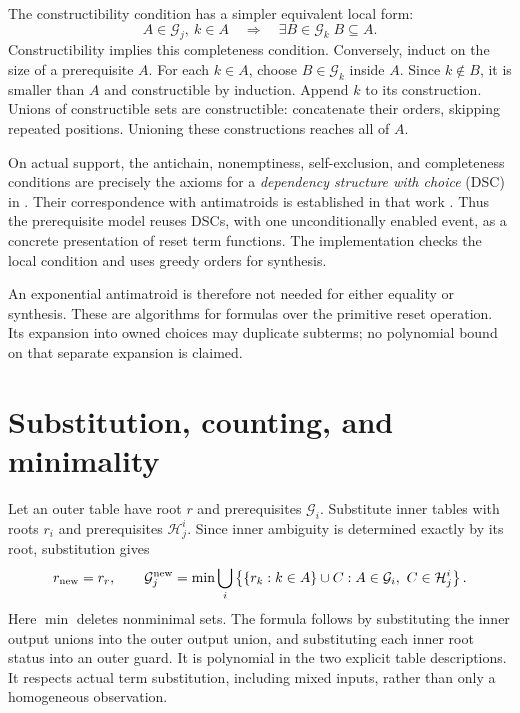 \documentclass[11pt]{article}
\begin{document}
The constructibility condition has a simpler equivalent local form:
\begin{equation}\label{eq:complete}
 A\in\mathcal G_j,\ k\in A
 \quad\Longrightarrow\quad
 \exists B\in\mathcal G_k\; B\subseteq A.
\end{equation}
Constructibility implies this completeness condition. Conversely,
induct on the size of a prerequisite $A$. For each $k\in A$, choose
$B\in\mathcal G_k$ inside $A$. Since $k\notin B$, it is smaller than
$A$ and constructible by induction. Append $k$ to its construction.
Unions of constructible sets are constructible: concatenate their
orders, skipping repeated positions. Unioning these constructions
reaches all of $A$.

On actual support, the antichain, nonemptiness, self-exclusion, and
completeness conditions are precisely the axioms for a \emph{dependency
structure with choice} (DSC) in
\cite[Definition~2.9]{BazermanMinichielloPuzio2023}. Their correspondence
with antimatroids is established in that work
\cite[Theorem~3.15]{BazermanMinichielloPuzio2023}. Thus the prerequisite
model reuses DSCs, with one unconditionally enabled event, as a concrete
presentation of reset term functions. The implementation checks the
local condition and uses greedy orders for synthesis.

An exponential antimatroid is therefore not needed for either
equality or synthesis. These are algorithms for formulas over the
primitive reset operation. Its expansion into owned choices may
duplicate subterms; no polynomial bound on that separate expansion
is claimed.

\section{Substitution, counting, and minimality}

Let an outer table have root $r$ and prerequisites $\mathcal G_i$.
Substitute inner tables with roots $r_i$ and prerequisites
$\mathcal H^i_j$. Since inner ambiguity is determined exactly by its
root, substitution gives
\begin{equation}\label{eq:substitution}
 r_{\rm new}=r_r,\qquad
 \mathcal G^{\rm new}_j=
 \min\bigcup_i
 \left\{\{r_k:k\in A\}\cup C:
       A\in\mathcal G_i,\ C\in\mathcal H^i_j\right\}.
\end{equation}
Here $\min$ deletes nonminimal sets. The formula follows by substituting
the inner output unions into the outer output union, and substituting
each inner root status into an outer guard. It is polynomial in the
two explicit table descriptions. It respects actual term substitution,
including mixed inputs, rather than only a homogeneous observation.
\end{document}
